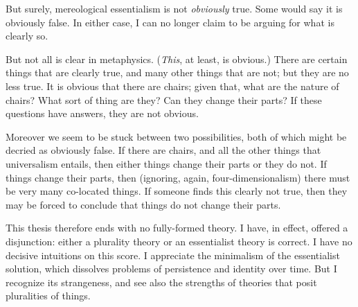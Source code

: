 \documentclass[11pt]{article}
\begin{document}
\begin{spacing}{1.5}
But surely, mereological essentialism is not {\em obviously} true.
Some would say it is obviously false.  In either case, I can no longer
claim to be arguing for what is clearly so.

But not all is clear in metaphysics.  ({\em This}, at least, is
obvious.)  There are certain things that are clearly true, and many
other things that are not; but they are no less true.  It is obvious
that there are chairs; given that, what are the nature of chairs?
What sort of thing are they?  Can they change their parts?  If these
questions have answers, they are not obvious.

Moreover we seem to be stuck between two possibilities, both of which
might be decried as obviously false.  If there are chairs, and all the
other things that universalism entails, then either things change
their parts or they do not.  If things change their parts, then
(ignoring, again, four-dimensionalism) there must be very many
co-located things.  If someone finds this clearly not true, then they
may be forced to conclude that things do not change their parts.

This thesis therefore ends with no fully-formed theory.  I have, in
effect, offered a disjunction: either a plurality theory or an
essentialist theory is correct. I have no decisive intuitions on this
score.  I appreciate the minimalism of the essentialist solution,
which dissolves problems of persistence and identity over time.  But I
recognize its strangeness, and see also the strengths of theories that
posit pluralities of things.

\ifstandalone
\end{spacing}


\fi
\end{document}

